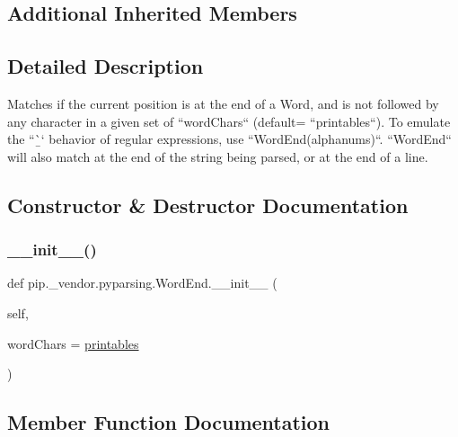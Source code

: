 \subsection*{Additional Inherited Members}


\subsection{Detailed Description}
\begin{DoxyVerb}Matches if the current position is at the end of a Word, and is
not followed by any character in a given set of ``wordChars``
(default= ``printables``). To emulate the ``\b`` behavior of
regular expressions, use ``WordEnd(alphanums)``. ``WordEnd``
will also match at the end of the string being parsed, or at the end
of a line.
\end{DoxyVerb}
 

\subsection{Constructor \& Destructor Documentation}
\mbox{\label{classpip_1_1__vendor_1_1pyparsing_1_1WordEnd_a4e39d8445513f1ee87c3873251ecbae2}} 
\subsubsection{\texorpdfstring{\+\_\+\+\_\+init\+\_\+\+\_\+()}{\_\_init\_\_()}}
{\footnotesize\ttfamily def pip.\+\_\+vendor.\+pyparsing.\+Word\+End.\+\_\+\+\_\+init\+\_\+\+\_\+ (\begin{DoxyParamCaption}\item[{}]{self,  }\item[{}]{word\+Chars = {\ttfamily \hyperlink{namespacepip_1_1__vendor_1_1pyparsing_ac9075b160f22a7b6557fff8c2fb1f329}{printables}} }\end{DoxyParamCaption})}



\subsection{Member Function Documentation}
\mbox{\label{classpip_1_1__vendor_1_1pyparsing_1_1WordEnd_ad2ab738df98e46741db8b93e48fa4335}} 
